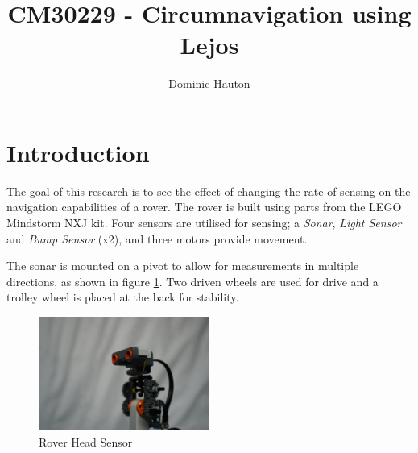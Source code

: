 \documentclass[a4paper,12pt,twocolumn]{report}
\title{CM30229 - Circumnavigation using Lejos}
\author{Dominic Hauton}
\begin{document}
\maketitle


\section{Introduction}



The goal of this research is to see the effect of changing the rate of sensing on the navigation capabilities of a rover. The rover is built using parts from the LEGO Mindstorm NXJ kit. Four sensors are utilised for sensing; a \emph{Sonar}, \emph{Light Sensor} and \emph{Bump Sensor} (x2), and three motors provide movement.

The sonar is mounted on a pivot to allow for measurements in multiple directions, as shown in figure \ref{fig:stanley-head}. Two driven wheels are used for drive and a trolley wheel is placed at the back for stability.

\begin{figure}[b]
 \includegraphics[width=0.5\textwidth]{headshot}
 \caption{Rover Head Sensor}
 \label{fig:stanley-head}
\end{figure}
\end{document}

